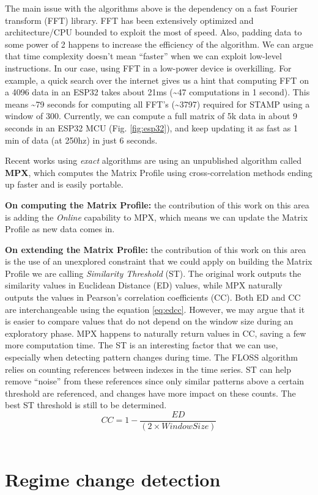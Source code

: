 \documentclass[12pt,twoside]{fmupthesis}
\begin{document}
The main issue with the algorithms above is the dependency on a fast Fourier transform (FFT)
library. FFT has been extensively optimized and architecture/CPU bounded to exploit the most of
speed. Also, padding data to some power of 2 happens to increase the efficiency of the
algorithm. We can argue that time complexity doesn't mean ``faster'' when we can exploit low-level
instructions. In our case, using FFT in a low-power device is overkilling. For example, a quick
search over the internet gives us a hint that computing FFT on a 4096 data in an ESP32 takes
about 21ms (\textasciitilde47 computations in 1 second). This means \textasciitilde79 seconds for computing all FFT's
(\textasciitilde3797) required for STAMP using a window of 300. Currently, we can compute a full matrix of 5k
data in about 9 seconds in an ESP32 MCU (Fig. \ref{fig:esp32}), and keep updating it as fast as
1 min of data (at 250hz) in just 6 seconds.

Recent works using \emph{exact} algorithms are using an unpublished algorithm called \textbf{MPX}, which
computes the Matrix Profile using cross-correlation methods ending up faster and is easily
portable.

\textbf{On computing the Matrix Profile:} the contribution of this work on this area is adding the
\emph{Online} capability to MPX, which means we can update the Matrix Profile as new data comes in.

\textbf{On extending the Matrix Profile:} the contribution of this work on this area is the use of an
unexplored constraint that we could apply on building the Matrix Profile we are calling \emph{Similarity
Threshold} (ST). The original work outputs the similarity values in Euclidean Distance (ED) values,
while MPX naturally outputs the values in Pearson's correlation coefficients (CC). Both ED and CC
are interchangeable using the equation \eqref{eq:edcc}. However, we may argue that it is easier to
compare values that do not depend on the window size during an exploratory phase. MPX happens to
naturally return values in CC, saving a few more computation time. The ST is an interesting factor
that we can use, especially when detecting pattern changes during time. The FLOSS algorithm relies
on counting references between indexes in the time series. ST can help remove ``noise'' from these
references since only similar patterns above a certain threshold are referenced, and changes have
more impact on these counts. The best ST threshold is still to be determined.
\begin{equation}
CC = 1 - \frac{ED}{(2 \times WindowSize)} \label{eq:edcc}
\end{equation}\\
\hypertarget{regime-change-detection-1}{%
\section{Regime change detection}\label{regime-change-detection-1}}
\end{document}
